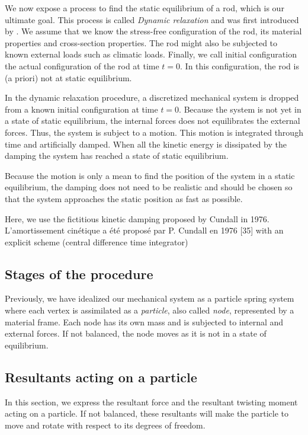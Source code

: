 We now expose a process to find the static equilibrium of a rod, which is our ultimate goal. This process is called \emph{Dynamic relaxation} and was first introduced by . We assume that we know the stress-free configuration of the rod, its material properties and cross-section properties. The rod might also be subjected to known external loads such as climatic loads. Finally, we call initial configuration the actual configuration of the rod at time $t=0$. In this configuration, the rod is (a priori) not at static equilibrium.

In the dynamic relaxation procedure, a discretized mechanical system is dropped from a known initial configuration at time $t=0$. Because the system is not yet in a state of static equilibrium, the internal forces does not equilibrates the external forces. Thus, the system is subject to a motion. This motion is integrated through time and artificially damped. When all the kinetic energy is dissipated by the damping the system has reached a state of static equilibrium.

Because the motion is only a mean to find the position of the system in a static equilibrium, the damping does not need to be realistic and should be chosen so that the system approaches the static position as fast as possible.

Here, we use the fictitious kinetic damping proposed by Cundall in 1976.
L’amortissement cinétique a été proposé par P. Cundall en 1976 [35]
with an explicit scheme (central difference time integrator)


\subsection{Stages of the procedure}
Previously, we have idealized our mechanical system as a  particle spring system where each vertex is assimilated as a \emph{particle}, also called \emph{node}, represented by a material frame. Each node has its own mass and is subjected to internal and external forces. If not balanced, the node moves as it is not in a state of equilibrium.

\subsection{Resultants acting on a particle}\label{sec:resFM}
In this section, we express the resultant force and the resultant twisting moment acting on a particle. If not balanced, these resultants will make the particle to move and rotate with respect to its degrees of freedom.

